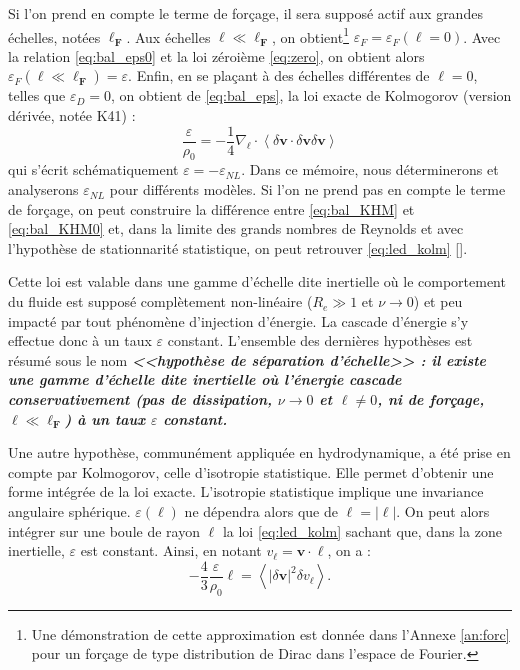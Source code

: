 Si l'on prend en compte le terme de forçage, il sera supposé actif aux grandes échelles, notées $\boldsymbol{\ell_F} $. Aux échelles $\boldsymbol{\ell} \ll \boldsymbol{\ell_F}$, on obtient\footnote{Une démonstration de cette approximation est donnée dans l'Annexe \ref{an:forc} pour un forçage de type distribution de Dirac dans l'espace de Fourier.} $\varepsilon_{F} = \varepsilon_{F}(\boldsymbol{\ell} =0)$.  Avec la relation \eqref{eq:bal_eps0} et la loi zéroième \eqref{eq:zero}, on obtient alors $\varepsilon_{F}(\boldsymbol{\ell} \ll \boldsymbol{\ell_F}) = \varepsilon$. Enfin, en se plaçant à des échelles différentes de $\boldsymbol{\ell} =0$, telles que $\varepsilon_{D}=0$, on obtient de \eqref{eq:bal_eps}, la loi exacte de Kolmogorov (version dérivée, notée \acs{K41}) : 
\begin{equation}
 \label{eq:led_kolm} \frac{\varepsilon}{\rho_0} = - \frac{1}{4} \nabla_{\boldsymbol{\ell}} \cdot \left<\delta \boldsymbol{v} \cdot \delta \boldsymbol{v} \delta \boldsymbol{v}\right>
\end{equation}
qui s'écrit schématiquement $\varepsilon=-\varepsilon_{NL}$. Dans ce mémoire, nous déterminerons et analyserons $\varepsilon_{NL}$ pour différents modèles. Si l'on ne prend pas en compte le terme de forçage, on peut construire la différence entre \eqref{eq:bal_KHM} et \eqref{eq:bal_KHM0} et, dans la limite des grands nombres de Reynolds et avec l'hypothèse de stationnarité statistique, on peut retrouver \eqref{eq:led_kolm} [\cite{antonia_analogy_1997}]. 

Cette loi est valable dans une gamme d'échelle dite inertielle où le comportement du fluide est supposé complètement non-linéaire ($R_e \gg 1$ et $\nu \rightarrow 0$) et peu impacté par tout phénomène d'injection d'énergie. La cascade d'énergie s'y effectue donc à un taux $\varepsilon$ constant. L'ensemble des dernières hypothèses est résumé sous le nom \textbf{\emph{<<hypothèse de séparation d'échelle>> : 
il existe une gamme d'échelle dite inertielle où l'énergie cascade conservativement (pas de dissipation, $\nu \rightarrow 0$ et $\boldsymbol{\ell} \neq 0$, ni de forçage, $\boldsymbol{\ell} \ll \boldsymbol{\ell_F}$) à un taux $\varepsilon$ constant.}} 

Une autre hypothèse, communément appliquée en hydrodynamique, a été prise en compte par Kolmogorov, celle d'isotropie statistique. Elle permet d'obtenir une forme intégrée de la loi exacte. L'isotropie statistique implique une invariance angulaire sphérique. $\varepsilon(\boldsymbol{\ell})$ ne dépendra alors que de $\ell = |\boldsymbol{\ell}|$. On peut alors intégrer sur une boule de rayon $\ell$ la loi \eqref{eq:led_kolm} sachant que, dans la zone inertielle, $\varepsilon$ est constant. Ainsi, en notant $v_{\ell} = \boldsymbol{v} \cdot \boldsymbol{\ell}$, on a : 
\begin{equation}
  \label{eq:kolmogorov}  - \frac{4}{3} \frac{\varepsilon}{\rho_0} \ell = \left<|\delta \boldsymbol{v}|^2 \delta v_{\ell}\right>.
\end{equation}

